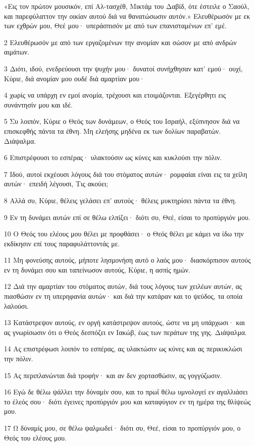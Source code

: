 \par «Εις τον πρώτον μουσικόν, επί Αλ-τασχέθ, Μικτάμ του Δαβίδ, ότε έστειλε ο Σαούλ, και παρεφύλαττον την οικίαν αυτού διά να θανατώσωσιν αυτόν.» Ελευθέρωσόν με εκ των εχθρών μου, Θεέ μου· υπεράσπισόν με από των επανισταμένων επ' εμέ.
\par 2 Ελευθέρωσόν με από των εργαζομένων την ανομίαν και σώσον με από ανδρών αιμάτων.
\par 3 Διότι, ιδού, ενεδρεύουσι την ψυχήν μου· δυνατοί συνήχθησαν κατ' εμού· ουχί, Κύριε, διά ανομίαν μου ουδέ διά αμαρτίαν μου·
\par 4 χωρίς να υπάρχη εν εμοί ανομία, τρέχουσι και ετοιμάζονται. Εξεγέρθητι εις συνάντησίν μου και ιδέ.
\par 5 Συ λοιπόν, Κύριε ο Θεός των δυνάμεων, ο Θεός του Ισραήλ, εξύπνησον διά να επισκεφθής πάντα τα έθνη. Μη ελεήσης μηδένα εκ των δολίων παραβατών. Διάψαλμα.
\par 6 Επιστρέφουσι το εσπέρας· υλακτούσιν ως κύνες και κυκλούσι την πόλιν.
\par 7 Ιδού, αυτοί εκχέουσι λόγους διά του στόματος αυτών· ρομφαίαι είναι εις τα χείλη αυτών· επειδή λέγουσι, Τις ακούει;
\par 8 Αλλά συ, Κύριε, θέλεις γελάσει επ' αυτούς· θέλεις μυκτηρίσει πάντα τα έθνη.
\par 9 Εν τη δυνάμει αυτών επί σε θέλω ελπίζει· διότι συ, Θεέ, είσαι το προπύργιόν μου.
\par 10 Ο Θεός του ελέους μου θέλει με προφθάσει· ο Θεός θέλει με κάμει να ίδω την εκδίκησιν επί τους παραφυλάττοντάς με.
\par 11 Μη φονεύσης αυτούς, μήποτε λησμονήση αυτό ο λαός μου· διασκόρπισον αυτούς εν τη δυνάμει σου και ταπείνωσον αυτούς, Κύριε, η ασπίς ημών.
\par 12 Διά την αμαρτίαν του στόματος αυτών, διά τους λόγους των χειλέων αυτών, ας πιασθώσιν εν τη υπερηφανία αυτών· και διά την κατάραν και το ψεύδος, τα οποία λαλούσι.
\par 13 Κατάστρεψον αυτούς, εν οργή κατάστρεψον αυτούς, ώστε να μη υπάρχωσι· και ας γνωρίσωσιν ότι ο Θεός δεσπόζει εν Ιακώβ, έως των περάτων της γης. Διάψαλμα.
\par 14 Ας επιστρέφωσι λοιπόν το εσπέρας, ας υλακτώσιν ως κύνες και ας περικυκλώσι την πόλιν.
\par 15 Ας περιπλανώνται διά τροφήν· και αν δεν χορτασθώσιν, ας γογγύζωσιν.
\par 16 Εγώ δε θέλω ψάλλει την δύναμίν σου, και το πρωΐ θέλω υμνολογεί εν αγαλλιάσει το έλεός σου· διότι έγεινες προπύργιόν μου και καταφύγιον εν τη ημέρα της θλίψεώς μου.
\par 17 Ω δύναμίς μου, σε θέλω ψαλμωδεί· διότι συ, Θεέ, είσαι το προπύργιόν μου, ο Θεός του ελέους μου.

